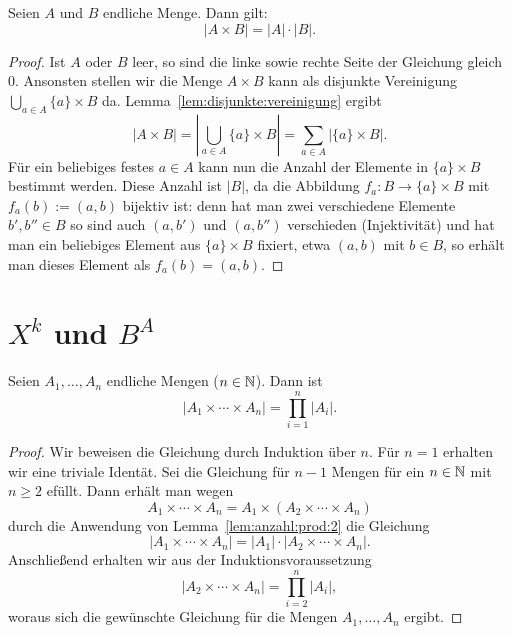 \begin{lem} \label{lem:anzahl:prod:2}
	Seien $A$ und $B$ endliche Menge. Dann gilt: 
	\[
		|A \times B| = |A| \cdot |B|. 
	\]
\end{lem}
\begin{proof} 
	Ist $A$ oder $B$ leer, so sind die linke sowie rechte Seite der Gleichung gleich $0$. Ansonsten stellen wir die Menge $A \times B$ kann als disjunkte Vereinigung $\bigcup_{a \in A} \{a\} \times B$ da. Lemma~\ref{lem:disjunkte:vereinigung} ergibt
	\[
		|A \times B| = \left| \bigcup_{a \in A} \{a \} \times B \right| = \sum_{a \in A} | \{a \} \times B |.
	\]
	Für ein beliebiges festes $a \in A$ kann nun die Anzahl der Elemente in $\{a\} \times B$ bestimmt werden. Diese Anzahl ist $|B|$, da die Abbildung $f_a : B \to \{a\} \times B$ mit $f_a(b) := (a,b)$ bijektiv ist: denn hat man zwei verschiedene Elemente $b',b'' \in B$ so sind auch $(a,b')$ und $(a,b'')$ verschieden (Injektivität) und hat man ein beliebiges Element aus $\{a\} \times B$ fixiert, etwa $(a,b)$ mit $b \in B$, so erhält man dieses Element als $f_a(b) = (a,b)$. 
\end{proof} 
 

\section{$X^k$ und $B^A$} 

\begin{thm}
	Seien $A_1,\ldots, A_n$ endliche Mengen ($n \in \mathbb{N}$). Dann ist 
	\[
		|A_1 \times \cdots \times A_n|  = \prod_{i=1}^n |A_i|. 
	\]
\end{thm} 
\begin{proof}
	Wir beweisen die Gleichung durch Induktion über $n$.
	Für $n=1$ erhalten wir eine triviale Identät. Sei die Gleichung für $n-1$ Mengen für ein $n \in \mathbb{N}$ mit $n \ge 2$ efüllt. Dann erhält man wegen 
	\[
			A_1 \times \cdots \times A_n = A_1 \times (A_2 \times \cdots \times A_n)
	\]
	durch die Anwendung von Lemma~\ref{lem:anzahl:prod:2} die Gleichung 
	\[
		|A_1 \times \cdots \times A_n | = |A_1| \cdot |A_2 \times \cdots \times A_n|. 
	\]
	Anschließend erhalten wir aus der Induktionsvoraussetzung 
	\[
		|A_2 \times \cdots \times A_n| = \prod_{i=2}^n |A_i|,
	\]
	woraus sich die gewünschte Gleichung für die Mengen $A_1,\ldots,A_n$ ergibt. 
\end{proof} 

\begin{bem}
	
\end{bem} 


